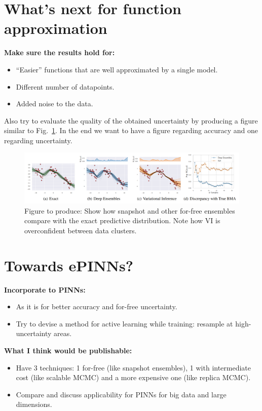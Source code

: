 \section{What's next for function approximation}
\noindent
\textbf{Make sure the results hold for:}
\begin{itemize}
	\item ``Easier'' functions that are well approximated by a single model.
	\item Different number of datapoints.
	\item Added noise to the data.
\end{itemize}
Also try to evaluate the quality of the obtained uncertainty by producing a figure similar to Fig.~\ref{fig:to_do}.
In the end we want to have a figure regarding accuracy and one regarding uncertainty.
\begin{figure}[H]
	\centering
	\includegraphics[width=1\linewidth]{./figs/fig_to_do.png}  
	\caption{Figure to produce: Show how snapshot and other for-free ensembles compare with the exact predictive distribution. Note how VI is overconfident between data clusters.}
	\label{fig:to_do}
\end{figure}

\section{Towards ePINNs?}
\noindent
\textbf{Incorporate to PINNs:}
\begin{itemize}
	\item As it is for better accuracy and for-free uncertainty.
	\item Try to devise a method for active learning while training: resample at high-uncertainty areas.
\end{itemize}
\noindent
\textbf{What I think would be publishable:}
\begin{itemize}
	\item Have 3 techniques: 1 for-free (like snapshot ensembles), 1 with intermediate cost (like scalable MCMC) and a more expensive one (like replica MCMC). 
	\item Compare and discuss applicability for PINNs for big data and large dimensions.
\end{itemize}


	
\printbibliography[heading=bibintoc,title={References}]
	
